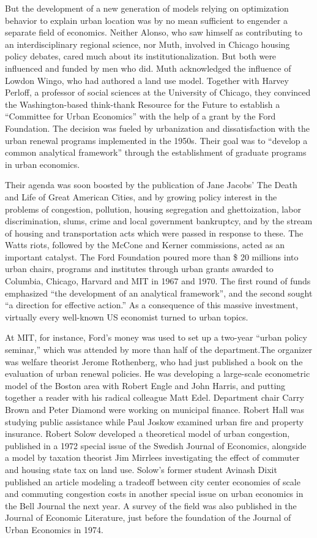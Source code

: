 \documentclass[
]{book}
\begin{document}
But the development of a new generation of models relying on optimization behavior to explain urban location was by no mean sufficient to engender a separate field of economics. Neither Alonso, who saw himself as contributing to an interdisciplinary regional science, nor Muth, involved in Chicago housing policy debates, cared much about its institutionalization. But both were influenced and funded by men who did. Muth acknowledged the influence of Lowdon Wingo, who had authored a land use model. Together with Harvey Perloff, a professor of social sciences at the University of Chicago, they convinced the Washington-based think-thank Resource for the Future to establish a ``Committee for Urban Economics'' with the help of a grant by the Ford Foundation. The decision was fueled by urbanization and dissatisfaction with the urban renewal programs implemented in the 1950s. Their goal was to ``develop a common analytical framework'' through the establishment of graduate programs in urban economics.

Their agenda was soon boosted by the publication of Jane Jacobs' The Death and Life of Great American Cities, and by growing policy interest in the problems of congestion, pollution, housing segregation and ghettoization, labor discrimination, slums, crime and local government bankruptcy, and by the stream of housing and transportation acts which were passed in response to these. The Watts riots, followed by the McCone and Kerner commissions, acted as an important catalyst. The Ford Foundation poured more than \$ 20 millions into urban chairs, programs and institutes through urban grants awarded to Columbia, Chicago, Harvard and MIT in 1967 and 1970. The first round of funds emphasized ``the development of an analytical framework'', and the second sought ``a direction for effective action.''
As a consequence of this massive investment, virtually every well-known US economist turned to urban topics.

At MIT, for instance, Ford's money was used to set up a two-year ``urban policy seminar,'' which was attended by more than half of the department.The organizer was welfare theorist Jerome Rothenberg, who had just published a book on the evaluation of urban renewal policies. He was developing a large-scale econometric model of the Boston area with Robert Engle and John Harris, and putting together a reader with his radical colleague Matt Edel. Department chair Carry Brown and Peter Diamond were working on municipal finance. Robert Hall was studying public assistance while Paul Joskow examined urban fire and property insurance. Robert Solow developed a theoretical model of urban congestion, published in a 1972 special issue of the Swedish Journal of Economics, alongside a model by taxation theorist Jim Mirrlees investigating the effect of commuter and housing state tax on land use. Solow's former student Avinash Dixit published an article modeling a tradeoff between city center economies of scale and commuting congestion costs in another special issue on urban economics in the Bell Journal the next year. A survey of the field was also published in the Journal of Economic Literature, just before the foundation of the Journal of Urban Economics in 1974.
\end{document}
